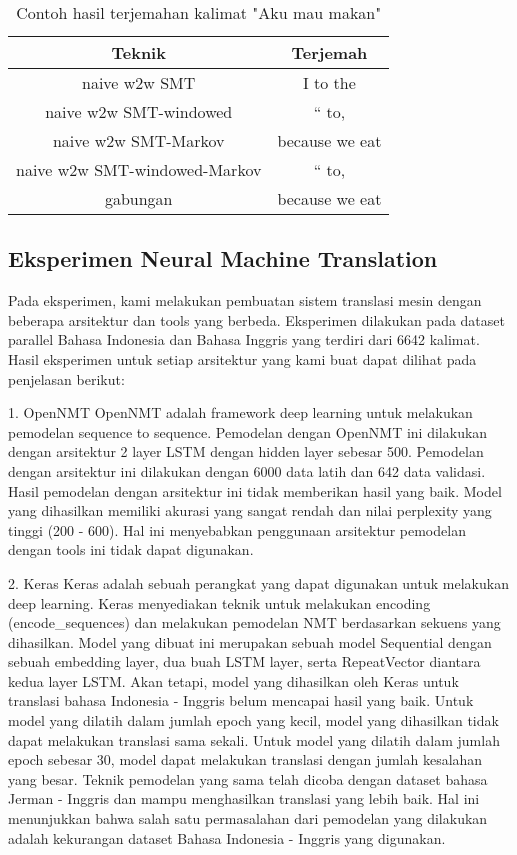 \documentclass[conference]{IEEEtran}
\begin{document}
\begin{table}
\caption{Contoh hasil terjemahan kalimat "Aku mau makan"}
\begin{center}
\begin{tabular}{|c|c|}
\hline
\textbf{Teknik}&\textbf{Terjemah}\\
\hline
naive w2w SMT & I to the \\
\hline
naive w2w SMT-windowed & `` to,\\
\hline
naive w2w SMT-Markov & because we eat\\
\hline
naive w2w SMT-windowed-Markov & `` to,\\
\hline
gabungan & because we eat\\
\hline
\end{tabular}
\end{center}
\label{tablecontohterjemah}
\end{table}

\subsection{Eksperimen Neural Machine Translation}
Pada eksperimen, kami melakukan pembuatan sistem translasi mesin dengan beberapa arsitektur dan tools yang berbeda. Eksperimen dilakukan pada dataset parallel Bahasa Indonesia dan Bahasa Inggris yang terdiri dari 6642 kalimat. Hasil eksperimen untuk setiap arsitektur yang kami buat dapat dilihat pada penjelasan berikut:

1. OpenNMT
OpenNMT adalah framework deep learning untuk melakukan pemodelan sequence to sequence. Pemodelan dengan OpenNMT ini dilakukan dengan arsitektur 2 layer LSTM dengan hidden layer sebesar 500. Pemodelan dengan arsitektur ini dilakukan dengan 6000 data latih dan 642 data validasi. Hasil pemodelan dengan arsitektur ini tidak memberikan hasil yang baik. Model yang dihasilkan memiliki akurasi yang sangat rendah dan nilai perplexity yang tinggi (200 - 600). Hal ini menyebabkan penggunaan arsitektur pemodelan dengan tools ini tidak dapat digunakan.

2. Keras
Keras adalah sebuah perangkat yang dapat digunakan untuk melakukan deep learning. Keras menyediakan teknik untuk melakukan encoding (encode_sequences) dan melakukan pemodelan NMT berdasarkan sekuens yang dihasilkan. Model yang dibuat ini merupakan sebuah model Sequential dengan sebuah embedding layer, dua buah LSTM layer, serta RepeatVector diantara kedua layer LSTM. Akan tetapi, model yang dihasilkan oleh Keras untuk translasi bahasa Indonesia - Inggris belum mencapai hasil yang baik. Untuk model yang dilatih dalam jumlah epoch yang kecil, model yang dihasilkan tidak dapat melakukan translasi sama sekali. Untuk model yang dilatih dalam jumlah epoch sebesar 30, model dapat melakukan translasi dengan jumlah kesalahan yang besar. Teknik pemodelan yang sama telah dicoba dengan dataset bahasa Jerman - Inggris dan mampu menghasilkan translasi yang lebih baik. Hal ini menunjukkan bahwa salah satu permasalahan dari pemodelan yang dilakukan adalah kekurangan dataset Bahasa Indonesia - Inggris yang digunakan.
\end{document}
